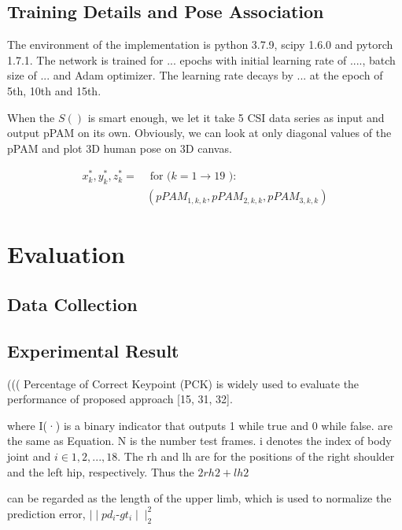 \documentclass[conference]{IEEEtran}
\begin{document}
	  
	 \subsection{Training Details and Pose Association}
	 
	 The environment of the implementation is python 3.7.9, scipy 1.6.0 and pytorch 1.7.1.
	 The network is trained for ... epochs with initial learning
	 rate of ...., batch size of ... and Adam optimizer. The learning rate decays by ... at the epoch of
	 5th, 10th and 15th.

	When the $S()$ is smart enough, we let it take 5 CSI data series as input and output pPAM on its own. Obviously, we can look at only diagonal values of the pPAM and plot 3D human pose on 3D canvas.
	
	\begin{equation}
	 \begin{aligned}
	 x_k^*,y_k^*,z_k^* = & \text{ for ($k = 1 \rightarrow 19$ ):} \\
	  & (pPAM_{1,k,k},pPAM_{2,k,k},pPAM_{3,k,k})
	 \end{aligned}
	\end{equation}
	
	
	\section{Evaluation}
	
	\subsection{Data Collection}
	
	
	\subsection{Experimental Result}
	(((
	Percentage of Correct Keypoint (PCK) is widely used to evaluate the performance of proposed
	approach [15, 31, 32].

	
	
	
	where I(·) is a binary indicator that outputs 1 while true and 0 while false. are the same as Equation.
	N is the number test frames. i denotes the index of body joint and $i \in {1, 2, ..., 18}$. The rh and
	lh are for the positions of the right shoulder and the left hip, respectively. Thus the $2rh2 + lh2$
	
	can be regarded as the length of the upper limb, which is used to normalize the prediction error,
	$ \mid \mid pd_i \text{-} gt_i \mid \mid _2^2$
	
\end{document}
